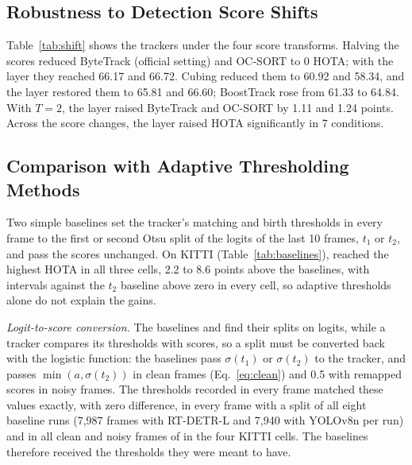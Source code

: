 







\subsection{Robustness to Detection Score Shifts}\label{sec:shift}
Table~\ref{tab:shift} shows the trackers under the four score transforms. Halving the scores
reduced ByteTrack (official setting) and OC-SORT to 0 HOTA; with the layer they reached 66.17 and
66.72. Cubing reduced them to 60.92 and 58.34, and the layer restored them to 65.81 and 66.60;
BoostTrack rose from 61.33 to 64.84. With $T=2$, the layer raised ByteTrack and OC-SORT by 1.11 and
1.24 points. Across the score changes, the layer raised HOTA significantly in 7 conditions.


\subsection{Comparison with Adaptive Thresholding Methods}\label{sec:baselines}
Two simple baselines set the tracker's matching and birth thresholds in every frame to the first or
second Otsu split of the logits of the last 10 frames, $t_1$ or $t_2$, and pass the scores
unchanged. On KITTI (Table~\ref{tab:baselines}), \scl{} reached the highest HOTA in all three
cells, 2.2 to 8.6 points above the baselines, with intervals against the $t_2$ baseline above zero
in every cell, so adaptive thresholds alone do not explain the gains.

\emph{Logit-to-score conversion.} The baselines and \scl{} find their splits on logits, while a
tracker compares its thresholds with scores, so a split must be converted back with the logistic
function: the baselines pass $\sigma(t_1)$ or $\sigma(t_2)$ to the tracker, and \scl{} passes
$\min(a,\sigma(t_2))$ in clean frames (Eq.~\eqref{eq:clean}) and 0.5 with remapped scores in noisy
frames. The thresholds recorded in every frame matched these values exactly, with zero difference,
in every frame with a split of all eight baseline runs (7,987 frames with RT-DETR-L and 7,940
with YOLOv8n per run) and in all clean and noisy frames of \scl{} in the four KITTI cells. The baselines therefore received the thresholds they were meant to have.

